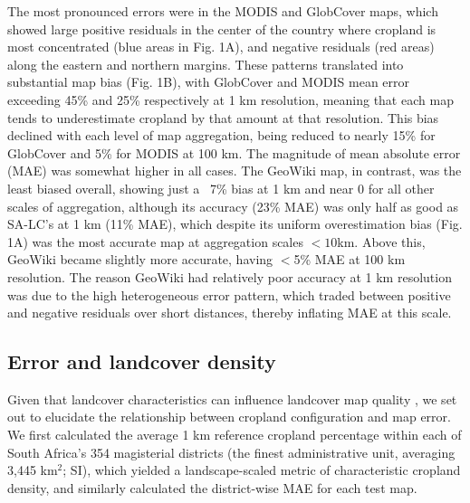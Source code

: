 \documentclass{pnastwo}
\begin{document}
\begin{article}

The most pronounced errors were in the MODIS and GlobCover maps, which showed large positive residuals in the center of the country where cropland is most concentrated (blue areas in Fig. 1A), and negative residuals (red areas) along the eastern and northern margins.
These patterns translated into substantial map bias (Fig. 1B), with GlobCover and MODIS mean error exceeding 45\% and 25\% respectively at 1 km resolution, meaning that each map tends to underestimate cropland by that amount at that resolution. This bias declined with each level of map aggregation, being reduced to nearly 15\% for GlobCover and 5\% for MODIS at 100 km. The magnitude of mean absolute error (MAE) was somewhat higher in all cases. The GeoWiki map, in contrast, was the least biased overall, showing just a ~7\% bias at 1 km and near 0 for all other scales of aggregation, although its accuracy (23\% MAE) was only half as good as SA-LC's at 1 km (11\% MAE), which despite its uniform overestimation bias (Fig. 1A) was the most accurate map at aggregation scales $<10$km. Above this, GeoWiki became slightly more accurate, having $<$5\% MAE at 100 km resolution. The reason GeoWiki had relatively poor accuracy at 1 km resolution was due to the high heterogeneous error pattern, which traded between positive and negative residuals over short distances, thereby inflating MAE at this scale.  

\subsection{Error and landcover density}
Given that landcover characteristics can influence landcover map quality \cite{see_improved_2015, estes_platform_2015, debats_generalized_2015}, we set out to elucidate the relationship between cropland configuration and map error.  We first calculated the average 1 km reference cropland percentage within each of South Africa's 354 magisterial districts (the finest administrative unit, averaging 3,445 km$^2$; SI), which yielded a landscape-scaled metric of characteristic cropland density, and similarly calculated the district-wise MAE for each test map. 


\end{article}
\end{document}
